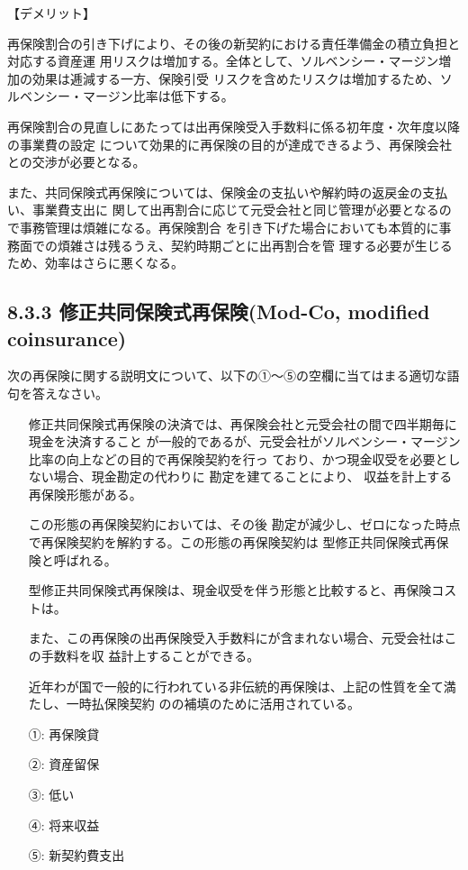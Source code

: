\documentclass[report,gutter=10mm,fore-edge=10mm,uplatex,dvipdfmx]{jlreq}
\begin{document}
\noindent 【デメリット】

再保険割合の引き下げにより、その後の新契約における責任準備金の積立負担と対応する資産運
用リスクは増加する。全体として、ソルベンシー・マージン増加の効果は逓減する一方、保険引受
リスクを含めたリスクは増加するため、ソルベンシー・マージン比率は低下する。

再保険割合の見直しにあたっては出再保険受入手数料に係る初年度・次年度以降の事業費の設定
について効果的に再保険の目的が達成できるよう、再保険会社との交渉が必要となる。

また、共同保険式再保険については、保険金の支払いや解約時の返戻金の支払い、事業費支出に
関して出再割合に応じて元受会社と同じ管理が必要となるので事務管理は煩雑になる。再保険割合
を引き下げた場合においても本質的に事務面での煩雑さは残るうえ、契約時期ごとに出再割合を管
理する必要が生じるため、効率はさらに悪くなる。

\subsection{8.3.3 修正共同保険式再保険(Mod-Co, modified coinsurance)}
次の再保険に関する説明文について、以下の①～⑤の空欄に当てはまる適切な語句を答えなさい。

\begin{itemize}
\item[] 修正共同保険式再保険の決済では、再保険会社と元受会社の間で四半期毎に現金を決済すること
 が一般的であるが、元受会社がソルベンシー・マージン比率の向上などの目的で再保険契約を行っ
 ており、かつ現金収受を必要としない場合、現金勘定の代わりに
 勘定を建てることにより、 収益を計上する再保険形態がある。

\item[] この形態の再保険契約においては、その後
 勘定が減少し、ゼロになった時点で再保険契約を解約する。この形態の再保険契約は
 型修正共同保険式再保険と呼ばれる。
\item[] 型修正共同保険式再保険は、現金収受を伴う形態と比較すると、再保険コストは。
\item[] また、この再保険の出再保険受入手数料にが含まれない場合、元受会社はこの手数料を収
 益計上することができる。
\item[] 近年わが国で一般的に行われている非伝統的再保険は、上記の性質を全て満たし、一時払保険契約
 のの補填のために活用されている。
\end{itemize}
\answer{}
\begin{itemize}
\item[ ①: ] 再保険貸
\item[ ②: ] 資産留保
\item[ ③: ] 低い
\item[ ④: ] 将来収益
\item[ ⑤: ] 新契約費支出
\end{itemize}
\end{document}
